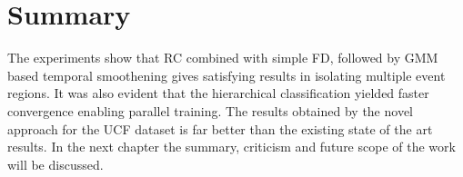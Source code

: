 \section{Summary}
The experiments show that RC combined with simple FD,  followed by GMM based temporal smoothening gives satisfying results in isolating multiple event regions.  It was also evident that the  hierarchical classification yielded  faster convergence enabling parallel training.  The results obtained by the novel approach  for the UCF dataset is far better than the existing state of the art results.  In the next chapter the summary, criticism and future scope of the work will be discussed.